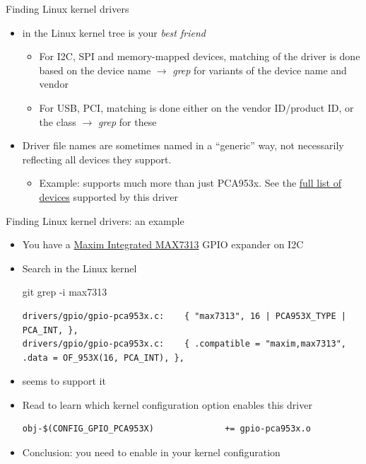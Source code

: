 \begin{frame}{Finding Linux kernel drivers}
  \begin{itemize}
  \item {} in the Linux kernel tree is your {\em best friend}
    \begin{itemize}
    \item For I2C, SPI and memory-mapped devices, matching of the
      driver is done based on the device name $\rightarrow$ {\em grep}
      for variants of the device name and vendor
    \item For USB, PCI, matching is done either on the vendor
      ID/product ID, or the class $\rightarrow$ {\em grep} for these
    \end{itemize}
  \item Driver file names are sometimes named in a ``generic'' way,
    not necessarily reflecting all devices they support.
    \begin{itemize}
    \item Example:  supports much
      more than just PCA953x. See the
      \href{https://elixir.bootlin.com/linux/v5.19/source/drivers/gpio/gpio-pca953x.c\#L1221}{full
        list of devices} supported by this driver
    \end{itemize}
  \end{itemize}
\end{frame}

\begin{frame}[fragile]{Finding Linux kernel drivers: an example}
  \begin{itemize}
  \item You have a
    \href{https://www.maximintegrated.com/en/products/interface/controllers-expanders/MAX7313.html}{Maxim
      Integrated MAX7313} GPIO expander on I2C
  \item Search in the Linux kernel
    \begin{block}{git grep -i max7313}
      {\tiny
\begin{verbatim}
drivers/gpio/gpio-pca953x.c:    { "max7313", 16 | PCA953X_TYPE | PCA_INT, },
drivers/gpio/gpio-pca953x.c:    { .compatible = "maxim,max7313", .data = OF_953X(16, PCA_INT), },
\end{verbatim}
      }
    \end{block}
  \item {} seems to support it
  \item Read  to learn which kernel
    configuration option enables this driver
    \begin{block}{}
      {\tiny
\begin{verbatim}
obj-$(CONFIG_GPIO_PCA953X)              += gpio-pca953x.o
\end{verbatim}
      }
    \end{block}
  \item Conclusion: you need to enable  in
    your kernel configuration
  \end{itemize}
\end{frame}

